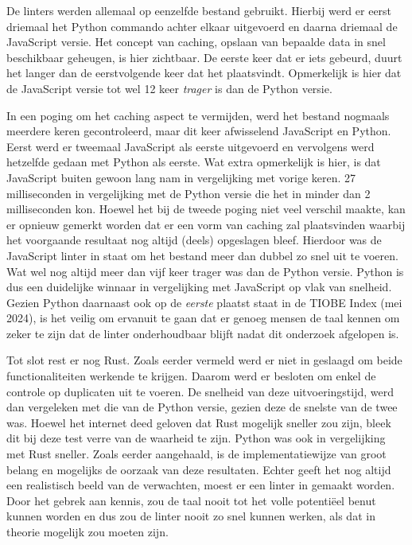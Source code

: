 De linters werden allemaal op eenzelfde bestand gebruikt. Hierbij werd er eerst driemaal het Python commando achter elkaar uitgevoerd en daarna driemaal de JavaScript versie. Het concept van caching, opslaan van bepaalde data in snel beschikbaar geheugen, is hier zichtbaar. De eerste keer dat er iets gebeurd, duurt het langer dan de eerstvolgende keer dat het plaatsvindt.
Opmerkelijk is hier dat de JavaScript versie tot wel 12 keer \emph{trager} is dan de Python versie.

In een poging om het caching aspect te vermijden, werd het bestand nogmaals meerdere keren gecontroleerd, maar dit keer afwisselend JavaScript en Python. Eerst werd er tweemaal JavaScript als eerste uitgevoerd en vervolgens werd hetzelfde gedaan met Python als eerste. Wat extra opmerkelijk is hier, is dat JavaScript buiten gewoon lang nam in vergelijking met vorige keren. 27 milliseconden in vergelijking met de Python versie die het in minder dan 2 milliseconden kon. Hoewel het bij de tweede poging niet veel verschil maakte, kan er opnieuw gemerkt worden dat er een vorm van caching zal plaatsvinden waarbij het voorgaande resultaat nog altijd (deels) opgeslagen bleef. Hierdoor was de JavaScript linter in staat om het bestand meer dan dubbel zo snel uit te voeren. Wat wel nog altijd meer dan vijf keer trager was dan de Python versie. Python is dus een duidelijke winnaar in vergelijking met JavaScript op vlak van snelheid. Gezien Python daarnaast ook op de \emph{eerste} plaatst staat in de TIOBE Index (mei 2024), is het veilig om ervanuit te gaan dat er genoeg mensen de taal kennen om zeker te zijn dat de linter onderhoudbaar blijft nadat dit onderzoek afgelopen is.

Tot slot rest er nog Rust. Zoals eerder vermeld werd er niet in geslaagd om beide functionaliteiten werkende te krijgen. Daarom werd er besloten om enkel de controle op duplicaten uit te voeren. De snelheid van deze uitvoeringstijd, werd dan vergeleken met die van de Python versie, gezien deze de snelste van de twee was. Hoewel het internet deed geloven dat Rust mogelijk sneller zou zijn, bleek dit bij deze test verre van de waarheid te zijn. Python was ook in vergelijking met Rust sneller. Zoals eerder aangehaald, is de implementatiewijze van groot belang en mogelijks de oorzaak van deze resultaten. Echter geeft het nog altijd een realistisch beeld van de verwachten, moest er een linter in gemaakt worden. Door het gebrek aan kennis, zou de taal nooit tot het volle potentiëel benut kunnen worden en dus zou de linter nooit zo snel kunnen werken, als dat in theorie mogelijk zou moeten zijn.

